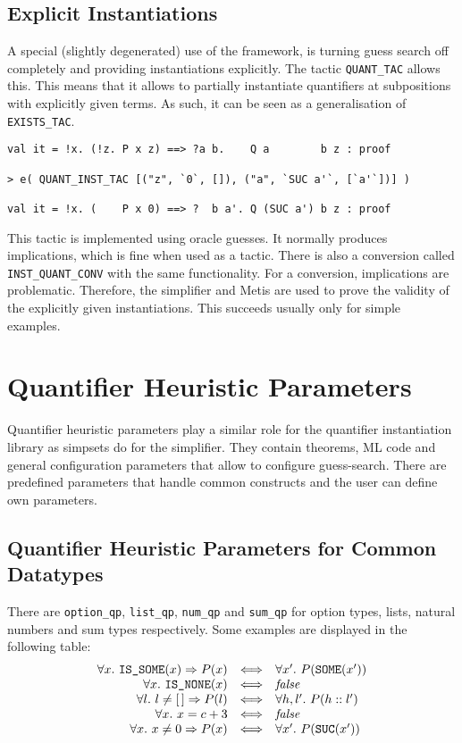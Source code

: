 \documentclass[a4paper,12pt,DIV=12,oneside]{scrbook}
\theoremstyle{definition}
\theoremstyle{remark}
\begin{document}
\subsection{Explicit Instantiations}

A special (slightly degenerated) use of the framework, is turning guess search off completely and
providing instantiations explicitly. The tactic \texttt{QUANT\_TAC} allows this. This means that
it allows to partially instantiate quantifiers at subpositions
with explicitly given terms. As such, it can be seen as
a generalisation of \texttt{EXISTS\_TAC}.
%
{\scriptsize
\begin{verbatim}
val it = !x. (!z. P x z) ==> ?a b.    Q a        b z : proof

> e( QUANT_INST_TAC [("z", `0`, []), ("a", `SUC a'`, [`a'`])] )

val it = !x. (    P x 0) ==> ?  b a'. Q (SUC a') b z : proof
\end{verbatim}}
%
This tactic is implemented using oracle guesses. It normally
produces implications, which is fine when used as a tactic. There is
also a conversion called \texttt{INST\_QUANT\_CONV} with the same
functionality. For a conversion, implications are
problematic. Therefore, the simplifier and Metis are used to prove
the validity of the explicitly given instantiations. This succeeds
usually only for simple examples.


\section{Quantifier Heuristic Parameters}\label{sec_qps}

Quantifier heuristic parameters play a similar role for the quantifier
instantiation library as simpsets do for the simplifier. They contain
theorems, ML code and general configuration parameters that allow to configure
guess-search. There are predefined parameters that handle
common constructs and the user can define own parameters.

\subsection{Quantifier Heuristic Parameters for Common Datatypes}

There are \texttt{option\_qp}, \texttt{list\_qp}, \texttt{num\_qp} and \texttt{sum\_qp} for option types, lists,
natural numbers and sum types respectively.
Some examples are displayed in the following table:
%
\[\begin{array}{r@{\quad \Longleftrightarrow \quad}l}
\forall x.\ \texttt{IS\_SOME}(x) \Rightarrow P(x) & \forall x'.\ P (\texttt{SOME}(x')) \\
\forall x.\ \texttt{IS\_NONE}(x)& \textit{false} \\
\forall l.\ l \neq [\,] \Rightarrow P(l)& \forall h, l'.\ P(h::l')  \\
\forall x.\ x = c + 3& \textit{false} \\
\forall x.\ x \neq 0 \Rightarrow P(x)& \forall x'.\ P(\texttt{SUC}(x'))
\end{array}\]
\end{document}
